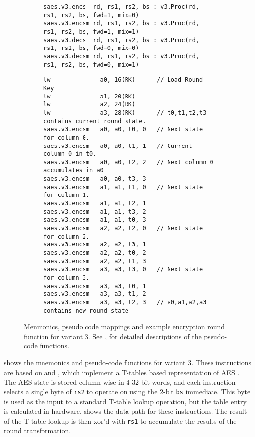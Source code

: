 
\begin{figure}
\begin{subfigure}{\textwidth}
\begin{lstlisting}[language=pseudo,style=block]
saes.v3.encs  rd, rs1, rs2, bs : v3.Proc(rd, rs1, rs2, bs, fwd=1, mix=0)
saes.v3.encsm rd, rs1, rs2, bs : v3.Proc(rd, rs1, rs2, bs, fwd=1, mix=1)
saes.v3.decs  rd, rs1, rs2, bs : v3.Proc(rd, rs1, rs2, bs, fwd=0, mix=0)
saes.v3.decsm rd, rs1, rs2, bs : v3.Proc(rd, rs1, rs2, bs, fwd=0, mix=1)
\end{lstlisting}
\caption{
}
\label{fig:mnemonics:v3}
\end{subfigure}
\begin{subfigure}{\textwidth}
\begin{lstlisting}[language=pseudo,style=block]
lw              a0, 16(RK)      // Load Round Key
lw              a1, 20(RK)
lw              a2, 24(RK)
lw              a3, 28(RK)      // t0,t1,t2,t3 contains current round state.
saes.v3.encsm   a0, a0, t0, 0   // Next state for column 0.
saes.v3.encsm   a0, a0, t1, 1   // Current column 0 in t0.
saes.v3.encsm   a0, a0, t2, 2   // Next column 0 accumulates in a0
saes.v3.encsm   a0, a0, t3, 3
saes.v3.encsm   a1, a1, t1, 0   // Next state for column 1.
saes.v3.encsm   a1, a1, t2, 1
saes.v3.encsm   a1, a1, t3, 2
saes.v3.encsm   a1, a1, t0, 3
saes.v3.encsm   a2, a2, t2, 0   // Next state for column 2.
saes.v3.encsm   a2, a2, t3, 1
saes.v3.encsm   a2, a2, t0, 2
saes.v3.encsm   a2, a2, t1, 3
saes.v3.encsm   a3, a3, t3, 0   // Next state for column 3.
saes.v3.encsm   a3, a3, t0, 1
saes.v3.encsm   a3, a3, t1, 2
saes.v3.encsm   a3, a3, t2, 3   // a0,a1,a2,a3 contains new round state
\end{lstlisting}
\caption{
}
\label{fig:round:v3}
\end{subfigure}
\caption{
    Menmonics, pseudo code mappings and example encryption
    round function for variant 3.
    See ,  for detailed
    descriptions of the pseudo-code functions.
}
\end{figure}

 shows the mnemonics and pseudo-code functions
for variant 3.
These instructions are based on
\cite{NadIkeKur:04,BBFR:06} and \cite{Saarinen:20},
which implement a T-tables based representation of AES \cite{DaeRij:02}.
The AES state is stored column-wise in $4$ $32$-bit words, and
each instruction selects a single byte of {\tt rs2} to operate on
using the $2$-bit {\tt bs} immediate.
This byte is used as the input to a standard T-table lookup operation,
but the table entry is calculated in hardware.
 shows the data-path for these instructions.
The result of the T-table lookup is then xor'd with {\tt rs1} to
accumulate the results of the round transformation.

